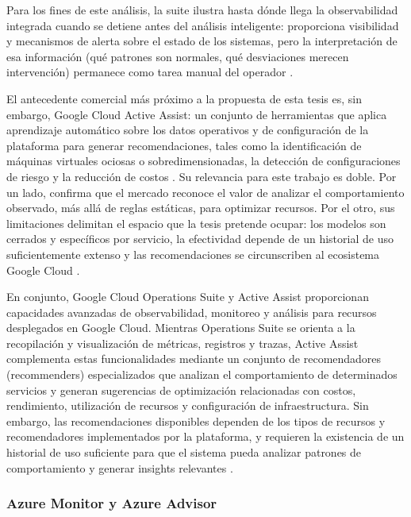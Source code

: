 Para los fines de este análisis, la suite ilustra hasta dónde llega la observabilidad integrada cuando se detiene antes del análisis inteligente: proporciona visibilidad y mecanismos de alerta sobre el estado de los sistemas, pero la interpretación de esa información (qué patrones son normales, qué desviaciones merecen intervención) permanece como tarea manual del operador \parencite{GoogleCloud2026}.

El antecedente comercial más próximo a la propuesta de esta tesis es, sin embargo, Google Cloud Active Assist: un conjunto de herramientas que aplica aprendizaje automático sobre los datos operativos y de configuración de la plataforma para generar recomendaciones, tales como la identificación de máquinas virtuales ociosas o sobredimensionadas, la detección de configuraciones de riesgo y la reducción de costos \parencite{GoogleCloud2026}. Su relevancia para este trabajo es doble. Por un lado, confirma que el mercado reconoce el valor de analizar el comportamiento observado, más allá de reglas estáticas, para optimizar recursos. Por el otro, sus limitaciones delimitan el espacio que la tesis pretende ocupar: los modelos son cerrados y específicos por servicio, la efectividad depende de un historial de uso suficientemente extenso y las recomendaciones se circunscriben al ecosistema Google Cloud \parencite{GoogleCloud2026}.

En conjunto, Google Cloud Operations Suite y Active Assist proporcionan capacidades avanzadas de observabilidad, monitoreo y análisis para recursos desplegados en Google Cloud. Mientras Operations Suite se orienta a la recopilación y visualización de métricas, registros y trazas, Active Assist complementa estas funcionalidades mediante un conjunto de recomendadores (recommenders) especializados que analizan el comportamiento de determinados servicios y generan sugerencias de optimización relacionadas con costos, rendimiento, utilización de recursos y configuración de infraestructura. Sin embargo, las recomendaciones disponibles dependen de los tipos de recursos y recomendadores implementados por la plataforma, y requieren la existencia de un historial de uso suficiente para que el sistema pueda analizar patrones de comportamiento y generar insights relevantes \parencite{GoogleCloud2026}.

\subsubsection{Azure Monitor y Azure Advisor}

